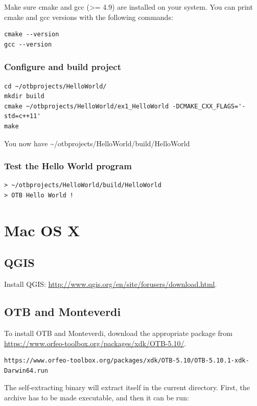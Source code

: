 \documentclass[10pt,a4paper]{article}
\begin{document}
Make sure cmake and gcc (>= 4.9) are installed on your system. You can print
cmake and gcc versions with the following commands: 

\begin{verbatim}
cmake --version
gcc --version
\end{verbatim}

\subsubsection{Configure and build project}

\begin{verbatim}
cd ~/otbprojects/HelloWorld/
mkdir build
cmake ~/otbprojects/HelloWorld/ex1_HelloWorld -DCMAKE_CXX_FLAGS='-std=c++11'
make
\end{verbatim}

You now have \textasciitilde/otbprojects/HelloWorld/build/HelloWorld

\subsubsection{Test the Hello World program}

\begin{verbatim}
> ~/otbprojects/HelloWorld/build/HelloWorld
> OTB Hello World !
\end{verbatim}

\section{Mac OS X}

\subsection{QGIS}
Install QGIS: \url{http://www.qgis.org/en/site/forusers/download.html}.

\subsection{OTB and Monteverdi}

To install OTB and Monteverdi, download the appropriate package from \url{https://www.orfeo-toolbox.org/packages/xdk/OTB-5.10/}.

\begin{verbatim}
https://www.orfeo-toolbox.org/packages/xdk/OTB-5.10/OTB-5.10.1-xdk-Darwin64.run
\end{verbatim}

The self-extracting binary will extract itself in the current directory. First,
the archive has to be made executable, and then it can be run:
\end{document}
